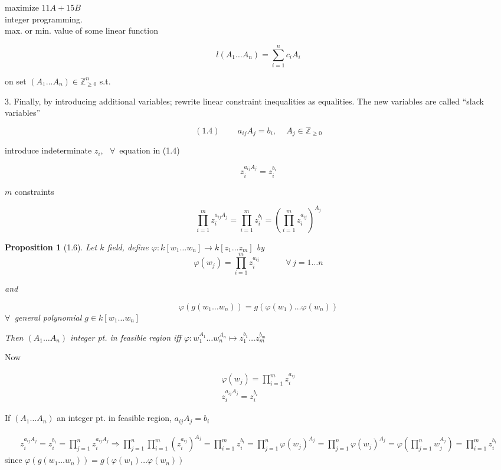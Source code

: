 \documentclass[10pt]{amsart}
\newtheorem{proposition}{Proposition}
\newcommand{\exercisehead}[1]
  { \smallskip
   \noindent{\small\bf Exercise #1.}
  }
\begin{document}
\begin{multicols*}{2}
maximize $11 A + 15 B$ \\

integer programming. \\
max. or min. value of some linear function 

\[
l(A_1 \dots A_n) = \sum_{i=1}^n c_i A_i 
\]

on set $(A_1 \dots A_n) \in \mathbb{Z}^n_{ \geq 0}$ s.t. 


3. Finally, by introducing additional variables; rewrite linear constraint inequalities as equalities. The new variables are called ``slack variables''

\begin{equation}
(1.4) \quad \quad \, a_{ij} A_j = b_i, \quad \, A_j \in \mathbb{Z}_{\geq 0}
\end{equation}

introduce indeterminate $z_i$, \, $\forall \, $ equation in (1.4)

\[
z_i^{a_{ij} A_j} = z_i^{b_i}
\]

$m$ constraints

\[
\prod_{i=1}^m z_i^{a_{ij}A_j} = \prod_{i=1}^m z_i^{b_i} = \left( \prod_{i=1}^m z_i^{a_{ij}} \right)^{ A_j}
\]

\begin{proposition}[1.6]
  Let $k$ field, define $\varphi: k[w_1 \dots w_n] \to k[z_1 \dots z_m]$ by 
\[
\varphi(w_j) = \prod_{i=1}^m z_i^{a_{ij}} \quad \quad \quad \, \forall \, j = 1 \dots n 
\]

and 

\[
\varphi(g(w_1 \dots w_n) ) = g(\varphi(w_1) \dots \varphi(w_n))
\]
$\forall \, $ general polynomial $g\in k[w_1 \dots w_n]$

Then $(A_1 \dots A_n)$ integer pt. in feasible region iff $\varphi: w_1^{A_1} \dots w_n^{A_n} \mapsto z_1^{b_1} \dots z_m^{b_m}$



\end{proposition}

\exercisehead{3}

Now 

\[
\begin{gathered}
\varphi(w_j) = \prod_{i=1}^m z_i^{a_{ij}} \\
z_i^{a_{ij} A_j} = z_i^{b_i}
\end{gathered}
\]

If $(A_1 \dots A_n)$ an integer pt. in feasible region, $a_{ij} A_j = b_i$

\[
\begin{gathered}
z_i^{a_{ij}A_j } = z_i^{b_i} = \prod_{j=1}^n z_i^{a_{ij} A_j} \Longrightarrow \prod_{j=1}^n \prod_{i=1}^m (z_i^{a_{ij} })^{A_j} = \prod_{i=1}^m z_i^{b_i} = \prod_{j=1}^n \varphi(w_j)^{ A_j} = \prod_{j=1}^n \varphi(w_j)^{A_j} = \varphi\left( \prod_{j=1}^n w_j^{ A_j } \right) = \prod_{i=1}^m z_i^{b_i}
\end{gathered}
\]
since $\varphi(g(w_1 \dots w_n)) = g(\varphi(w_1) \dots \varphi(w_n))$ \\


\end{multicols*}
\end{document}
